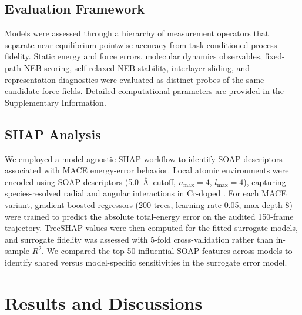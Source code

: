 \documentclass[pdflatex,sn-mathphys-num]{sn-jnl}%
\providecommand{\reviewermap}[3]{}
\theoremstyle{thmstyleone}%
\theoremstyle{thmstyletwo}%
\theoremstyle{thmstylethree}%
\begin{document}
\subsection{Evaluation Framework}
Models were assessed through a hierarchy of measurement operators that separate near-equilibrium pointwise accuracy from task-conditioned process fidelity. Static energy and force errors, molecular dynamics observables, fixed-path NEB scoring, self-relaxed NEB stability, interlayer sliding, and representation diagnostics were evaluated as distinct probes of the same candidate force fields. Detailed computational parameters are provided in the Supplementary Information.



\subsection{SHAP Analysis}

\reviewermap{REV-A6/REV-C13}{partial}{SHAP methods updated to the audited 150-frame absolute-energy-error surrogate workflow; final public code-release evidence remains pending.}

We employed a model-agnostic SHAP workflow to identify SOAP descriptors associated with MACE energy-error behavior. Local atomic environments were encoded using SOAP descriptors (5.0~\AA\ cutoff, $n_{\mathrm{max}}=4$, $l_{\mathrm{max}}=4$), capturing species-resolved radial and angular interactions in Cr-doped . For each MACE variant, gradient-boosted regressors (200 trees, learning rate 0.05, max depth 8) were trained to predict the absolute total-energy error on the audited 150-frame trajectory. TreeSHAP values were then computed for the fitted surrogate models, and surrogate fidelity was assessed with 5-fold cross-validation rather than in-sample $R^2$. We compared the top 50 influential SOAP features across models to identify shared versus model-specific sensitivities in the surrogate error model.


\section{Results and Discussions}
\end{document}
